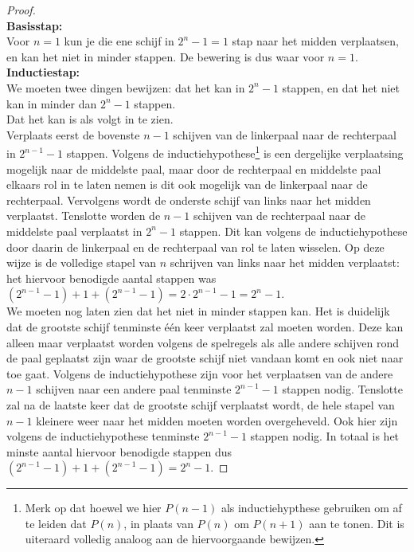 \begin{proof}\mbox{}\\
\textbf{Basisstap:}\\
Voor $n=1$ kun je die ene schijf in $2^n-1=1$ stap naar het midden verplaatsen, en kan het niet in minder stappen. De bewering is dus waar voor $n=1$.\\[5pt]
\textbf{Inductiestap:}\\
We moeten twee dingen bewijzen: dat het kan in $2^n-1$ stappen, en dat het niet kan in minder dan $2^n-1$ stappen.\\
Dat het kan is als volgt in te zien.\\
Verplaats eerst de bovenste $n-1$ schijven van de linkerpaal naar de rechterpaal in $2^{n-1}-1$ stappen. Volgens de inductiehypothese\footnote{Merk op dat hoewel we hier $P(n-1)$ als inductiehypthese gebruiken om af te leiden dat $P(n)$, in plaats van $P(n)$ om $P(n+1)$ aan te tonen. Dit is uiteraard volledig analoog aan de hiervoorgaande bewijzen.} is een dergelijke verplaatsing mogelijk naar de middelste paal, maar door de rechterpaal en middelste paal elkaars rol in te laten nemen is dit ook mogelijk van de linkerpaal naar de rechterpaal. Vervolgens wordt de onderste schijf van links naar het midden verplaatst. Tenslotte worden de $n-1$ schijven van de rechterpaal naar de middelste paal verplaatst in $2^n-1$ stappen. Dit kan volgens de inductiehypothese door daarin de linkerpaal en de rechterpaal van rol te laten wisselen. Op deze wijze is de volledige stapel van $n$ schrijven van links naar het midden verplaatst: het hiervoor benodigde aantal stappen was $(2^{n-1}-1)+1+(2^{n-1}-1) = 2\cdot 2^{n-1}-1=2^n-1$.\\
We moeten nog laten zien dat het niet in minder stappen kan. Het is duidelijk dat de grootste schijf tenminste \'e\'en keer verplaatst zal moeten worden. Deze kan alleen maar verplaatst worden volgens de spelregels als alle andere schijven rond de paal geplaatst zijn waar de grootste schijf niet vandaan komt en ook niet naar toe gaat. Volgens de inductiehypothese zijn voor het verplaatsen van de andere $n-1$ schijven naar een andere paal tenminste $2^{n-1}-1$ stappen nodig. Tenslotte zal na de laatste keer dat de grootste schijf verplaatst wordt, de hele stapel van $n-1$ kleinere weer naar het midden moeten worden overgeheveld. Ook hier zijn volgens de inductiehypothese tenminste $2^{n-1}-1$ stappen nodig. In totaal is het minste aantal hiervoor benodigde stappen dus $(2^{n-1}-1)+1+(2^{n-1}-1)=2^n-1$.
\end{proof}

